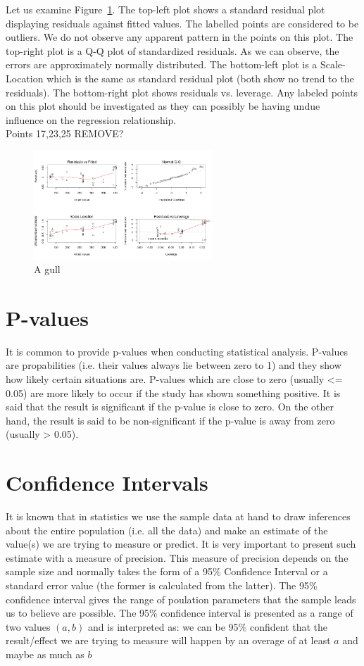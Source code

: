 \documentclass[a4paper,12pt, english]{article}
\begin{document}
Let us examine Figure~\ref{fig:cu-goodness}. The top-left plot shows a standard residual plot displaying residuals against fitted values. The labelled points are considered to be outliers. We do not observe any apparent pattern in the points on this plot. The top-right plot is a Q-Q plot of standardized residuals. As we can observe, the errors are approximately normally distributed. The bottom-left plot is a Scale-Location which is the same as standard residual plot (both show no trend to the residuals). The bottom-right plot shows residuals vs. leverage. Any labeled points on this plot should be investigated as they can possibly be having undue influence on the regression relationship.\\
Points 17,23,25 REMOVE?


\begin{figure}[!htbp]
  \centering
  \includegraphics[width=0.6\textwidth]{cu-goodness}
  \caption{A gull}
  \label{fig:cu-goodness}
\end{figure}


\section{P-values}
It is common to provide p-values when conducting statistical analysis. P-values are propabilities (i.e. their values always lie between zero to 1) and they show how likely certain situations are. P-values which are close to zero (usually <= 0.05) are more likely to occur if the study has shown something positive. It is said that the result is significant if the p-value is close to zero. On the other hand, the result is said to be non-significant if the p-value is away from zero (usually > 0.05).

\section{Confidence Intervals}
It is known that in statistics we use the sample data at hand to draw inferences about the entire population (i.e. all the data) and make an estimate of the value(s) we are trying to measure or predict. It is very important to present such estimate with a measure of precision. This measure of precision depends on the sample size and normally takes the form of a 95\% Confidence Interval or a standard error value (the former is calculated from the latter). The 95\% confidence interval gives the range of poulation parameters that the sample leads us to believe are possible. 
The 95\% confidence interval is presented as a range of two values $(a,b)$ and is interpreted as: we can be 95\% confident that the result/effect we are trying to measure will happen by an overage of at least $a$ and maybe as much as $b$
\end{document}
